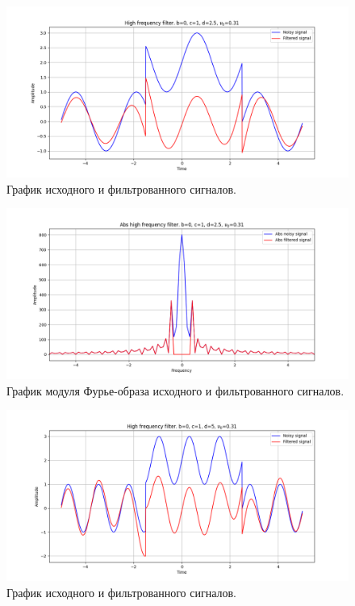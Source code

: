 \documentclass[a4paper, 12pt]{article}
\begin{document}
    \begin{figure}[!htb]
        \centering
        \includegraphics[scale=0.485]{19_u_flt_u_nolow.png}
        \captionsetup{skip=0pt}
        \caption{График исходного и фильтрованного сигналов.}
        \label{fig:fig63}
    \end{figure}
    \begin{figure}[!htb]
        \centering
        \includegraphics[scale=0.485]{19_abs_u_U_nolow.png}
        \captionsetup{skip=0pt}
        \caption{График модуля Фурье-образа исходного и фильтрованного сигналов.}
        \label{fig:fig64}
    \end{figure}
    \begin{figure}[!htb]
        \centering
        \includegraphics[scale=0.485]{20_u_flt_u_nolow.png}
        \captionsetup{skip=0pt}
        \caption{График исходного и фильтрованного сигналов.}
        \label{fig:fig65}
    \end{figure}
\end{document}
